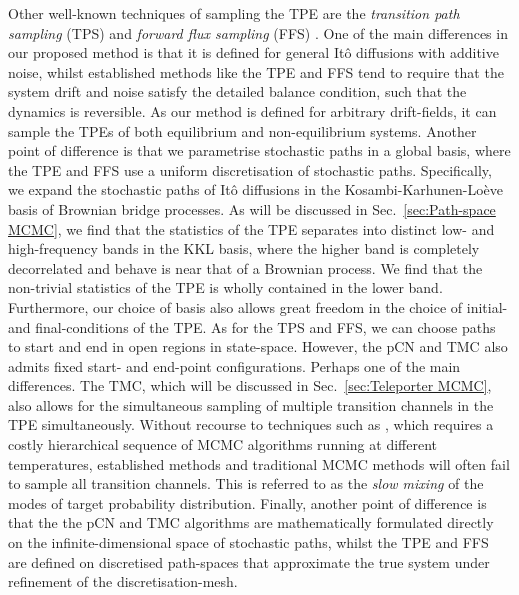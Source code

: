 Other well-known techniques of sampling the TPE are the \textit{transition path sampling} (TPS) \citep{dellagoTransitionPathSampling1998a, dellagoCalculationReactionRate1999a, dellagoEfficientTransitionPath1998, bolhuisTransitionPathSamplinga, bolhuisTransitionPathSampling2002a} and \textit{forward flux sampling} (FFS) \citep{escobedoTransitionPathSampling2009, allenForwardFluxSamplingtype2006, hussainStudyingRareEvents2020}. One of the main
 differences in our proposed method is that it is defined for general It\^{o} diffusions with additive noise, whilst established methods like the TPE and FFS tend to require that the system drift and noise satisfy the detailed balance condition, such that the dynamics is reversible. As our method is defined for arbitrary drift-fields, it can sample the TPEs of both equilibrium and non-equilibrium systems. Another point of difference is that we parametrise stochastic paths in a global basis, where the TPE and FFS use a uniform discretisation of stochastic paths. Specifically, we expand the stochastic paths of It\^{o} diffusions in the Kosambi-Karhunen-Lo\`eve basis of Brownian bridge processes. As will be discussed in Sec.~\ref{sec:Path-space MCMC}, we find that the statistics of the TPE separates into distinct low- and high-frequency bands in the KKL basis, where the higher band is completely decorrelated and behave is near that of a Brownian process. We find that the non-trivial statistics of the TPE is wholly contained in the lower band. Furthermore, our choice of basis also allows great freedom in the choice of initial- and final-conditions of the TPE. As for the TPS and FFS, we can choose paths to start and end in open regions in state-space. However, the pCN and TMC also admits fixed start- and end-point configurations. Perhaps one of the main differences. The TMC, which will be discussed in Sec.~\ref{sec:Teleporter MCMC}, also allows for the simultaneous sampling of multiple transition channels in the TPE simultaneously. Without recourse to techniques such as \citep{earlParallelTemperingTheory2005, fujisakiOnsagerMachlupActionbased2010a}, which requires a costly hierarchical sequence of MCMC algorithms running at different temperatures, established methods and traditional MCMC methods will often fail to sample all transition channels. This is referred to as the \textit{slow mixing} \citep{holdenMixingMCMCAlgorithms2019} of the modes of target probability distribution. Finally, another point of difference is that the the pCN and TMC algorithms are mathematically formulated directly on the infinite-dimensional space of stochastic paths, whilst the TPE and FFS are defined on discretised path-spaces that approximate the true system under refinement of the discretisation-mesh.


